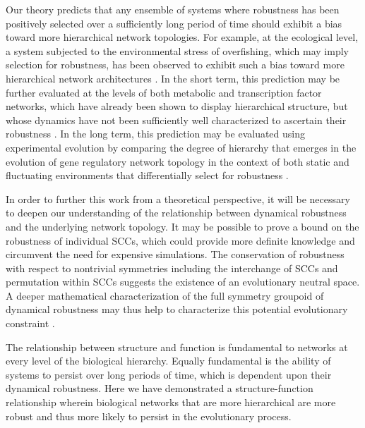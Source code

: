 Our theory predicts that any ensemble of systems where robustness has been positively selected over a sufficiently long period of time should exhibit a bias toward more hierarchical network topologies. For example, at the ecological level, a system subjected to the environmental stress of overfishing, which may imply selection for robustness, has been observed to exhibit such a bias toward more hierarchical network architectures \cite{Bascompte2005}. In the short term, this prediction may be further evaluated at the levels of both metabolic and transcription factor networks, which have already been shown to display hierarchical structure, but whose dynamics have not been sufficiently well characterized to ascertain their robustness \cite{Zhao2006,Bhardwaj2010,Colm}.
In the long term, this prediction may be evaluated using experimental evolution by comparing the degree of hierarchy that emerges in the evolution of gene regulatory network topology in the context of both static and fluctuating environments that differentially select for robustness \cite{Leroi1994}.

In order to further this work from a theoretical perspective, it will be necessary to deepen our understanding of the relationship between dynamical robustness and the underlying network topology.
It may be possible to prove a bound on the robustness of individual SCCs, which could provide more definite knowledge and circumvent the need for expensive simulations. The conservation of robustness with respect to nontrivial symmetries including the interchange of SCCs and permutation within SCCs suggests the existence of an evolutionary neutral space. A deeper mathematical characterization of the full symmetry groupoid of dynamical robustness may thus help to characterize this potential evolutionary constraint \cite{Golubitsky2006}.

The relationship between structure and function is fundamental to networks at every level of the biological hierarchy. Equally fundamental is the ability of systems to persist over long periods of time, which is dependent upon their dynamical robustness. Here we have demonstrated a structure-function relationship wherein biological networks that are more hierarchical are more robust and thus more likely to persist in the evolutionary process.
